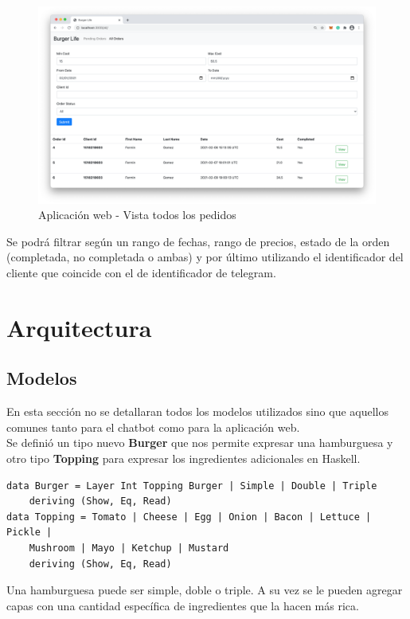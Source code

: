 \documentclass[a4paper,12pt]{article}
\begin{document}
\begin{figure}[H]
	\centering
	\includegraphics[width=1.0\linewidth]{webapp-search}
	\caption{Aplicación web - Vista todos los pedidos}
	\label{fig:webapp all orders}
\end{figure}

Se podrá filtrar según un rango de fechas, rango de precios, estado de la orden (completada, no completada o ambas) y por último utilizando el identificador del cliente que coincide con el de identificador de telegram.

\pagebreak

\section{Arquitectura}

\subsection{Modelos}

En esta sección no se detallaran todos los modelos utilizados sino que aquellos comunes tanto para el chatbot como para la aplicación web.
\\
Se definió un tipo nuevo \textbf{Burger} que nos permite expresar una hamburguesa y otro tipo \textbf{Topping} para expresar los ingredientes adicionales en Haskell.

\begin{verbatim}
data Burger = Layer Int Topping Burger | Simple | Double | Triple 
	deriving (Show, Eq, Read)
data Topping = Tomato | Cheese | Egg | Onion | Bacon | Lettuce | Pickle |
	Mushroom | Mayo | Ketchup | Mustard  
	deriving (Show, Eq, Read)
\end{verbatim}

Una hamburguesa puede ser simple, doble o triple. A su vez se le pueden agregar capas con una cantidad específica de ingredientes que la hacen más rica.
\end{document}
